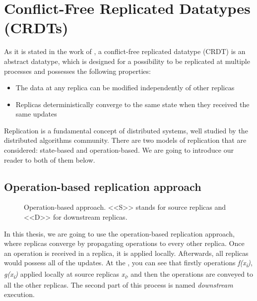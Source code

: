 \section{Conflict-Free Replicated Datatypes (CRDTs)}
\label{2-crdts}

As it is stated in the work of \citet{3}, a conflict-free replicated datatype (CRDT) is an abstract datatype, which is designed for a possibility to be replicated at multiple processes and possesses the following properties:


    \begin{itemize}
        \item {The data at any replica can be modified independently of other replicas}
        \item {Replicas deterministically converge to the same state when they received the same updates}
    \end{itemize}

Replication is a fundamental concept of distributed systems, well studied by the distributed algorithms community\cite{2}. There are two models of replication that are considered: state-based and operation-based. We are going to introduce our reader to both of them below. 

\subsection*{Operation-based replication approach}

\begin{figure}[!htb]
    \begin{center}
    \def\svgwidth{\linewidth}
    
    \caption {Operation-based approach\cite{2}. <<S>> stands for source replicas and <<D>> for downstream replicas. }
    \label{fig:theory1}
\end{center}
\end{figure}

In this thesis, we are going to use the operation-based replication approach, where replicas converge by propagating operations to every other replica\cite{3}. Once an operation is received in a replica, it is applied locally. Afterwards, all replicas would possess all of the updates. At the , you can see that firstly operations \textit{f(x\textsubscript{i})}, \textit{g(x\textsubscript{i})} applied locally at source replicas \textit{x\textsubscript{i}}, and then the operations are conveyed to all the other replicas. The second part of this process is named \textit{downstream} execution.

